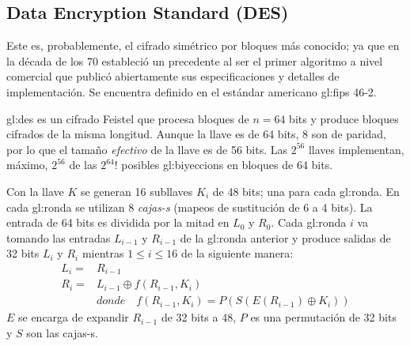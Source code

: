 %
%

\subsection{Data Encryption Standard (DES)}
\label{sec:des}

Este es, probablemente, el cifrado simétrico por bloques más conocido;
ya que en la década de los 70 estableció un precedente al ser el primer
algoritmo a nivel comercial que publicó abiertamente sus
especificaciones y detalles de implementación. Se encuentra definido
en el estándar americano \gls{gl:fips} 46-2.

\gls{gl:des} es un cifrado Feistel que procesa bloques de $n=64$ bits y
produce bloques cifrados de la misma longitud. Aunque la llave es de 64 bits,
8 son de paridad, por lo que el tamaño \textit{efectivo} de la llave es de
56 bits. Las $2^{56}$ llaves implementan, máximo, $2^{56}$ de las
$2^{64}!$ posibles \glspl{gl:biyeccion} en bloques de 64 bits.

Con la llave $K$ se generan 16 subllaves $K_i$ de 48 bits; una para cada
\gls{gl:ronda}. En cada \gls{gl:ronda} se utilizan 8 \textit{cajas-s}
(mapeos de sustitución de 6 a 4 bits). La entrada de 64 bits es dividida por la
mitad en $L_0$ y $R_0$. Cada \gls{gl:ronda} $i$ va tomando las entradas
$L_{i-1}$ y $R_{i-1}$ de la \gls{gl:ronda} anterior y produce salidas de 32
bits $L_i$ y $R_i$ mientras $1 \leq i \leq 16$ de la siguiente manera:
\begin{equation}
  \label{cifrado_des}
  \begin{aligned}
    L_i = {} & R_{i-1} \\
    R_i = {} & L_{i-1} \oplus f(R_{i-1}, K_i) \\
    & donde \quad f(R_{i-1}, K_i) = P(S(E(R_{i-1})\oplus K_i))
  \end{aligned}
\end{equation}
$E$ se encarga de expandir $R_{i-1}$ de 32 bits a 48, $P$ es una
permutación de 32 bits y $S$ son las cajas-s.

